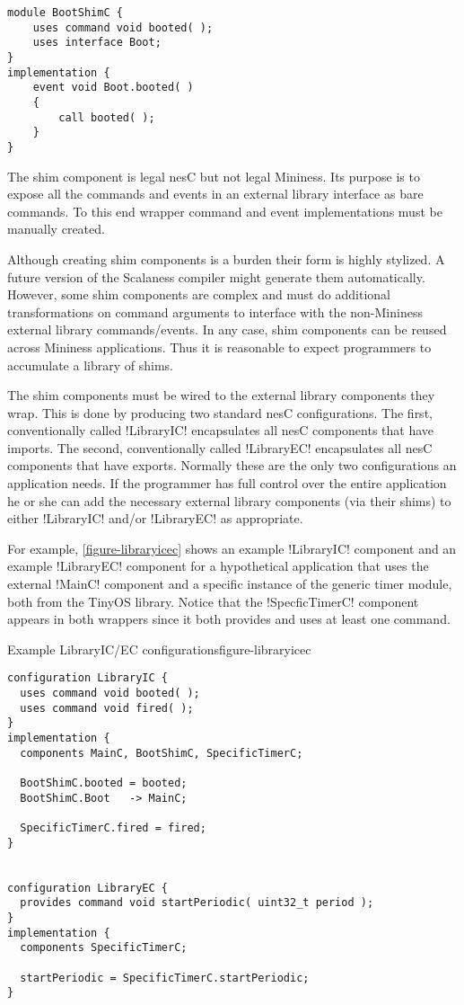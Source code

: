 \singlespace
\vspace{1.0ex}
\begin{lstlisting}[language=nesC]
module BootShimC {
    uses command void booted( );
    uses interface Boot;
}
implementation {
    event void Boot.booted( )
    {
        call booted( );
    }
}
\end{lstlisting}
\vspace{1.0ex}
\primaryspacing

The shim component is legal nesC but not legal Mininess. Its purpose is to expose all the
commands and events in an external library interface as bare commands. To this end wrapper
command and event implementations must be manually created.

Although creating shim components is a burden their form is highly stylized. A future version of
the Scalaness compiler might generate them automatically. However, some shim components are
complex and must do additional transformations on command arguments to interface with the
non-Mininess external library commands/events. In any case, shim components can be reused across
Mininess applications. Thus it is reasonable to expect programmers to accumulate a library of
shims.

The shim components must be wired to the external library components they wrap. This is done by
producing two standard nesC configurations. The first, conventionally called !LibraryIC!
encapsulates all nesC components that have imports. The second, conventionally called
!LibraryEC! encapsulates all nesC components that have exports. Normally these are the only two
configurations an application needs. If the programmer has full control over the entire
application he or she can add the necessary external library components (via their shims) to
either !LibraryIC! and/or !LibraryEC! as appropriate.

For example, \autoref{figure-libraryicec} shows an example !LibraryIC! component and an example
!LibraryEC! component for a hypothetical application that uses the external !MainC! component
and a specific instance of the generic timer module, both from the TinyOS library. Notice that
the !SpecficTimerC! component appears in both wrappers since it both provides and uses at least
one command. 

\singlespace
\begin{fpfig}[tbhp]{Example LibraryIC/EC configurations}{figure-libraryicec}
{
\begin{lstlisting}[language=nesC]
configuration LibraryIC {
  uses command void booted( );
  uses command void fired( );
}
implementation {
  components MainC, BootShimC, SpecificTimerC;

  BootShimC.booted = booted;
  BootShimC.Boot   -> MainC;

  SpecificTimerC.fired = fired;
}


configuration LibraryEC {
  provides command void startPeriodic( uint32_t period );
}
implementation {
  components SpecificTimerC;

  startPeriodic = SpecificTimerC.startPeriodic;
}
\end{lstlisting}
}
\end{fpfig}
\primaryspacing

